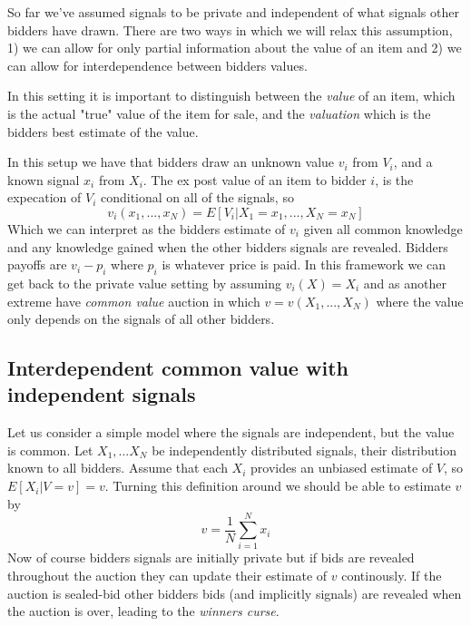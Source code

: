 So far we've assumed signals to be private and independent of what signals other bidders have drawn. There are two ways in which we will relax this assumption, 1) we can allow for only partial information about the value of an item and 2) we can allow for interdependence between bidders values.

In this setting it is important to distinguish between the \textit{value} of an item, which is the actual "true" value of the item for sale, and the \textit{valuation} which is the bidders best estimate of the value.

In this setup we have that bidders draw an unknown value $v_i$ from $V_i$, and a known signal $x_i$ from $X_i$. The ex post value of an item to bidder $i$, is the expecation of $V_i$ conditional on all of the signals, so
\begin{equation}
  v_i(x_1, ..., x_N) = E[V_i | X_1 = x_1, ..., X_N = x_N]
\end{equation}
Which we can interpret as the bidders estimate of $v_i$ given all common knowledge and any knowledge gained when the other bidders signals are revealed. Bidders payoffs are $v_i - p_i$ where $p_i$ is whatever price is paid. In this framework we can get back to the private value setting by assuming $v_i(X) = X_i$ and as another extreme have \textit{common value} auction in which $v=v(X_1, ...,X_N)$ where the value only depends on the signals of all other bidders.


\subsection{Interdependent common value with independent signals}
Let us consider a simple model where the signals are independent, but the value is common. Let $X_1,...X_N$ be independently distributed signals, their distribution known to all bidders. Assume that each $X_i$ provides an unbiased estimate of $V$, so $E[X_i |V = v] =v$. Turning this definition around we should be able to estimate $v$ by
\begin{equation}
v = \frac{1}{N} \sum_{i=1}^N x_i
\end{equation}
Now of course bidders signals are initially private but if bids are revealed throughout the auction they can update their estimate of $v$ continously. If the auction is sealed-bid other bidders bids (and implicitly signals) are revealed when the auction is over, leading to the \textit{winners curse}.

